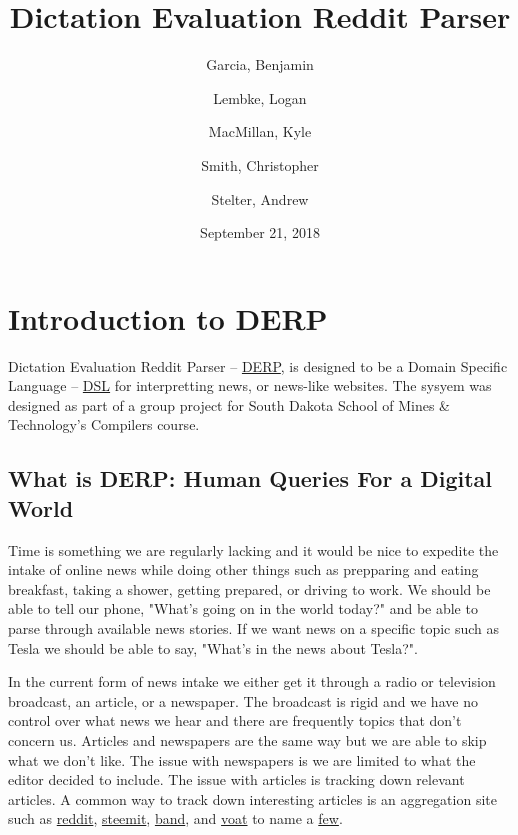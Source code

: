 \documentclass{article}
\title{\textbf{Dictation Evaluation Reddit Parser}}
\author{
Garcia, Benjamin \and
Lembke, Logan \and 
MacMillan, Kyle  \and 
Smith, Christopher \and 
Stelter, Andrew 
}
\date{September 21, 2018}
\begin{document}
\maketitle

\newpage
\tableofcontents
{}




\newpage
{}  %

\section{\textbf{Introduction to DERP}}

\setcounter{page}{1} %
Dictation Evaluation Reddit Parser -- \href{https://gitlab.mcs.sdsmt.edu/7184015/DERP}{DERP}, is designed to be a Domain Specific Language -- \href{https://en.wikipedia.org/wiki/Domain-specific_language}{DSL} for interpretting news, or news-like websites. The sysyem was designed as part of a group project for South Dakota School of Mines \& Technology's Compilers course.

\subsection{What is DERP: Human Queries For a Digital World}
Time is something we are regularly lacking and it would be nice to expedite the intake of online news while doing other things such as prepparing and eating breakfast, taking a shower, getting prepared, or driving to work. We should be able to tell our phone, "What's going on in the world today?" and be able to parse through available news stories. If we want news on a specific topic such as Tesla we should be able to say, "What's in the news about Tesla?".

In the current form of news intake we either get it through a radio or television broadcast, an article, or a newspaper. The broadcast is rigid and we have no control over what news we hear and there are frequently topics that don't concern us. Articles and newspapers are the same way but we are able to skip what we don't like. The issue with newspapers is we are limited to what the editor decided to include. The issue with articles is tracking down relevant articles. A common way to track down interesting articles is an aggregation site such as \href{https://www.reddit.com}{reddit}, \href{https://steemit.com/}{steemit}, \href{https://band.us/home}{band}, and \href{https://voat.co/}{voat} to name a \href{https://www.reddit.com/r/RedditAlternatives/comments/8585ox/list_of_active_reddit_alternatives/}{few}.
\end{document}
